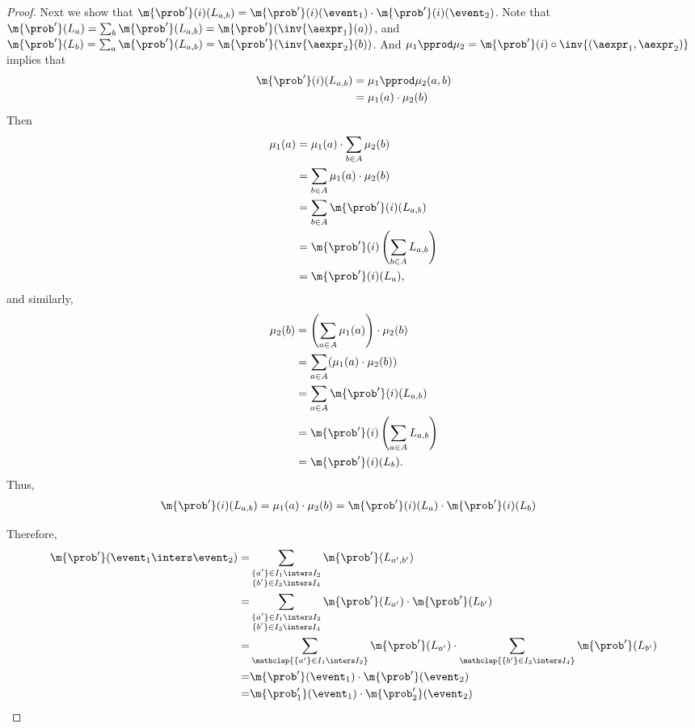 \begin{proof}
Next we show that
       $         \m{\prob'}(i) (L_{a, b})
         = \m{\prob'}(i) (\event_1) \cdot \m{\prob'}(i) (\event_2)$.
         Note that
      $\m{\prob'}(L_a)  = \sum_{b} \m{\prob'}(L_{a,b}) = \m{\prob'}(\inv{\aexpr_1}(a))$,
      and
      $\m{\prob'}(L_b)  = \sum_{a} \m{\prob'}(L_{a,b}) = \m{\prob'}(\inv{\aexpr_2}(b))$.
      And $\mu_1 \pprod \mu_2 = \m{\prob'}(i) \circ \inv{(\aexpr_1, \aexpr_2)}$
      implies that
      \begin{align*}
        \m{\prob'}(i) (L_{a, b})
        &= \mu_1 \pprod \mu_2 (a, b)\\
        &=\mu_1(a) \cdot \mu_2(b)
      \end{align*}
      Then
      \begin{align*}
        \mu_1(a)
        &= \mu_1(a) \cdot \sum_{b \in A} \mu_2(b)\\
        &= \sum_{b \in A} \mu_1(a) \cdot \mu_2(b) \\
        &= \sum_{b \in A} \m{\prob'}(i) (L_{a, b}) \\
        &= \m{\prob'}(i) \left(\sum_{b \in A} L_{a, b}\right)  \\
        &= \m{\prob'}(i) (L_a),
      \end{align*}
      and similarly,
      \begin{align*}
        \mu_2(b)
        &= \left(\sum_{a \in A} \mu_1(a)\right) \cdot \mu_2(b)\\
        &= \sum_{a \in A} (\mu_1(a) \cdot \mu_2(b))\\
        &= \sum_{a \in A} \m{\prob'}(i) (L_{a, b}) \\
        &= \m{\prob'}(i) \left(\sum_{a \in A} L_{a, b}\right)  \\
        &= \m{\prob'}(i) (L_b).
      \end{align*}
      Thus,
      \begin{align*}
         \m{\prob'}(i) (L_{a, b})
         &=\mu_1(a) \cdot \mu_2(b)
         = \m{\prob'}(i) (L_a) \cdot \m{\prob'}(i) (L_b)
      \end{align*}



Therefore,
       \begin{align*}
         \m{\prob'}(\event_1 \inters \event_2)
         =&  \sum_{\substack{\{a'\} \in I_1 \inters I_2 \\ \{b'\} \in I_3 \inters I_4}} \m{\prob'}(L_{a', b'}) \\
         =&  \sum_{\substack{\{a'\} \in I_1 \inters I_2 \\ \{b'\} \in I_3 \inters I_4}} \m{\prob'}(L_{a'}) \cdot \m{\prob'}(L_{b'}) \\
       =&  \sum_{\mathclap{\{a'\} \in I_1 \inters I_2}}  \m{\prob'}(L_{a'}) \cdot \sum_{\mathclap{\{b'\} \in I_3 \inters I_4}} \m{\prob'}(L_{b'}) \\
       =& \m{\prob'}(\event_1) \cdot \m{\prob'}(\event_2)\\
       =& \m{\prob_1'}(\event_1) \cdot \m{\prob_2'}(\event_2)
      \end{align*}


\end{proof}

